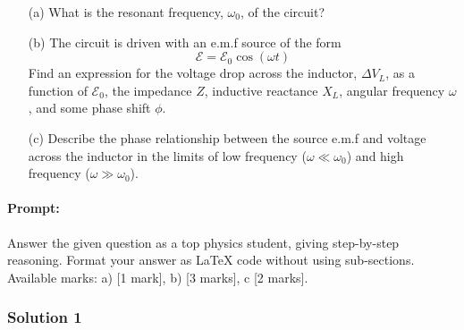 \documentclass{article}
\begin{document}
\begin{enumerate}
    \item[(a)] What is the resonant frequency, $\omega_0$, of the circuit?  

    \item[(b)] The circuit is driven with an e.m.f source of the form  
    \[
    \mathcal{E} = \mathcal{E}_0 \cos(\omega t)
    \]  
    Find an expression for the voltage drop across the inductor, $\Delta V_L$, as a function of $\mathcal{E}_0$, the impedance $Z$, inductive reactance $X_L$, angular frequency $\omega$, and some phase shift $\phi$.  

    \item[(c)] Describe the phase relationship between the source e.m.f and voltage across the inductor in the limits of low frequency ($\omega \ll \omega_0$) and high frequency ($\omega \gg \omega_0$).
\end{enumerate}


\paragraph{Prompt: \\} 
Answer the given question as a top physics student, giving step-by-step reasoning. Format your answer as LaTeX code without using sub-sections. Available marks: a) [1 mark], b) [3 marks], c [2 marks].

\subsubsection{Solution 1}
\end{document}

